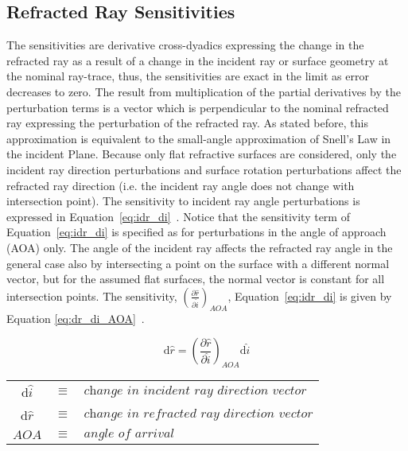 \subsection{Refracted Ray Sensitivities}
\label{sec:refractedRaySensitivities}
The sensitivities  are derivative cross-dyadics expressing the change in the refracted ray as a result of a change in the incident ray or surface geometry at the nominal ray-trace, thus, the sensitivities are exact in the limit as error decreases to zero. The result from multiplication of the partial derivatives by the perturbation terms is a vector which is perpendicular to the nominal refracted ray expressing the perturbation of the refracted ray. As stated before, this approximation is equivalent to the small-angle approximation of Snell's Law in the incident Plane. Because only flat refractive surfaces are considered, only the incident ray direction perturbations and surface rotation perturbations affect the refracted ray direction (i.e. the incident ray angle does not change with intersection point). The sensitivity to incident ray angle perturbations is expressed in Equation~\eqref{eq:idr_di}~\cite{RedBreck}. Notice that the sensitivity term of Equation~\eqref{eq:idr_di} is specified as for perturbations in the angle of approach (AOA) only. The angle of the incident ray affects the refracted ray angle in the general case also by intersecting a point on the surface with a different normal vector, but for the assumed flat surfaces, the normal vector is constant for all intersection points. The sensitivity, $\left(\frac{\partial\hat{r}}{\partial\hat{i}}\right)_{AOA}$, Equation~\eqref{eq:idr_di} is given by Equation \eqref{eq:dr_di_AOA}~\cite{RedBreck}.

\begin{table}[H]			%
\centering
\begin{equation}		%
\label{eq:idr_di}
\textrm{d}\hat{r} = \left(\dfrac{\partial\hat{r}}{\partial\hat{i}}\right)_{AOA}  \textrm{d}\hat{i}
\end{equation}
\begin{tabular}{cll}
d$\hat{i}$ & $\equiv$ & $\textit{change in incident ray direction vector}$ \\
d$\hat{r}$ & $\equiv$ & $\textit{change in refracted ray direction vector}$ \\
$AOA$ & $\equiv$ & $\textit{angle of arrival}$
\end{tabular}
\end{table}

